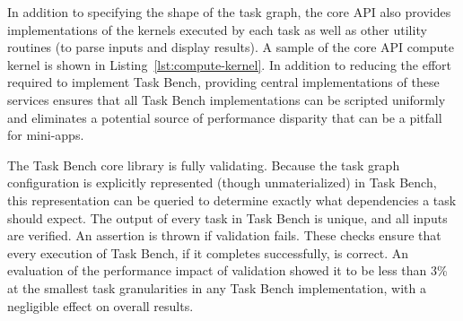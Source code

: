 
In addition to specifying the shape of the task graph, the
core API also provides implementations of the kernels
executed by each task as well as other utility routines (to parse
inputs and display results). A sample of the core API compute kernel
is shown in Listing~\ref{lst:compute-kernel}. In addition to reducing
the effort required to implement Task Bench, providing central
implementations of these services ensures that all Task Bench
implementations can be scripted uniformly and eliminates a potential
source of performance disparity that can be a pitfall for mini-apps.






The Task Bench core library is fully
validating. Because the task graph configuration is explicitly
represented (though unmaterialized) in Task Bench, this representation
can be queried to determine exactly what dependencies a task should
expect. The output of every task in Task Bench is unique,
and all inputs are verified. An assertion is thrown if validation
fails. These checks ensure that every execution of Task Bench, if it
completes successfully, is correct. An evaluation of the performance impact of
validation showed it to be less than 3\% at the smallest task
granularities in any Task Bench implementation, with a negligible
effect on overall results.

